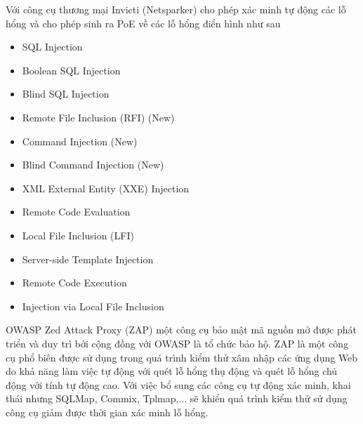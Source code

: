 \documentclass[./../main.tex]{subfiles}
\begin{document}
Với công cụ thương mại Invicti (Netsparker) cho phép xác minh tự động các lỗ hổng và cho phép sinh ra PoE về các lỗ hổng điển hình như sau
\begin{itemize}
	\item SQL Injection
	\item Boolean SQL Injection
	\item Blind SQL Injection
	\item Remote File Inclusion (RFI) (New)
	\item Command Injection (New)
	\item Blind Command Injection (New)
	\item XML External Entity (XXE) Injection
	\item Remote Code Evaluation
	\item Local File Inclusion (LFI)
	\item Server-side Template Injection
	\item Remote Code Execution
	\item Injection via Local File Inclusion
\end{itemize}

OWASP Zed Attack Proxy (ZAP) một công cụ bảo mật mã nguồn mở được phát triển và duy trì bởi cộng đồng với OWASP là tổ chức bảo hộ. ZAP là một công cụ phổ biến được sử dụng trong quá trình kiểm thử xâm nhập các ứng dụng Web do khả năng làm việc tự động với quét lỗ hổng thụ động và quét lỗ hổng chủ động với tính tự động cao. Với việc bổ sung các công cụ tự động xác minh, khai thái nhưng SQLMap, Commix, Tplmap,... sẽ khiển quá trình kiểm thử sử dụng công cụ giảm được thời gian xác minh lỗ hổng.
\end{document}
